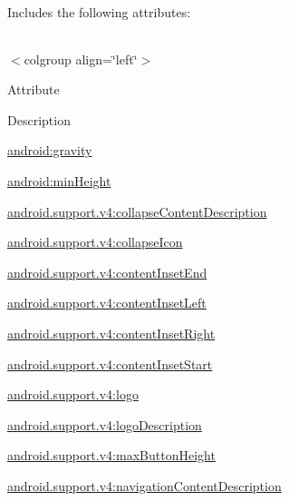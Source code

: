 Includes the following attributes\+:

\tabulinesep=1mm
\begin{longtabu} spread 0pt [c]{*{0}{|X[-1]}|}
\hline
\end{longtabu}
$<$colgroup align=\char`\"{}left\char`\"{}$>$ 

Attribute

Description 

{\ttfamily \hyperlink{classandroid_1_1support_1_1v4_1_1R_1_1styleable_ac91be82152f33f614697a5b2014cb489}{android\+:gravity}}

{\ttfamily \hyperlink{classandroid_1_1support_1_1v4_1_1R_1_1styleable_a0d3b075d587ebf9dd415672f35ff77a2}{android\+:min\+Height}}

{\ttfamily \hyperlink{classandroid_1_1support_1_1v4_1_1R_1_1styleable_a4cbc87868c5e4c8ff2456bc78168f833}{android.\+support.\+v4\+:collapse\+Content\+Description}}

{\ttfamily \hyperlink{classandroid_1_1support_1_1v4_1_1R_1_1styleable_adc48ca7e6b4af1cbf953aca1ddd4dc52}{android.\+support.\+v4\+:collapse\+Icon}}

{\ttfamily \hyperlink{classandroid_1_1support_1_1v4_1_1R_1_1styleable_a32c9d8c6dd8f327b1ee2c2fe3ab0a630}{android.\+support.\+v4\+:content\+Inset\+End}}

{\ttfamily \hyperlink{classandroid_1_1support_1_1v4_1_1R_1_1styleable_ac27607dd846e87108d867c8f656dc01f}{android.\+support.\+v4\+:content\+Inset\+Left}}

{\ttfamily \hyperlink{classandroid_1_1support_1_1v4_1_1R_1_1styleable_aa53bacd1f9f065115238222bc4ca4f5d}{android.\+support.\+v4\+:content\+Inset\+Right}}

{\ttfamily \hyperlink{classandroid_1_1support_1_1v4_1_1R_1_1styleable_ae49023876e1eb052f0650805f60750f1}{android.\+support.\+v4\+:content\+Inset\+Start}}

{\ttfamily \hyperlink{classandroid_1_1support_1_1v4_1_1R_1_1styleable_a02896a17125399cab8807ad63d4b9bf2}{android.\+support.\+v4\+:logo}}

{\ttfamily \hyperlink{classandroid_1_1support_1_1v4_1_1R_1_1styleable_a189537d807b0fafbff95c6fc64aba407}{android.\+support.\+v4\+:logo\+Description}}

{\ttfamily \hyperlink{classandroid_1_1support_1_1v4_1_1R_1_1styleable_a6b04787e5b1049d59002016f695019df}{android.\+support.\+v4\+:max\+Button\+Height}}

{\ttfamily \hyperlink{classandroid_1_1support_1_1v4_1_1R_1_1styleable_a6160a902fc7264d07ae23eb1d7d2e966}{android.\+support.\+v4\+:navigation\+Content\+Description}}

